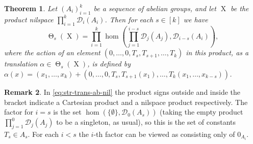 \documentclass[a4paper,12pt,reqno]{amsart}
\newtheorem{theorem}{Theorem}[section]
\theoremstyle{definition}
\newtheorem{remark}[theorem]{Remark}
\newcommand{\mc}{\mathcal}
\DeclareMathOperator{\tran}{\Theta}
\DeclareMathOperator{\ns}{X}
\begin{document}
\begin{theorem}\label{thm:decrip-trans-group}
Let $(A_i)_{i=1}^k$ be a sequence of abelian groups, and let $\ns$ be the product nilspace $\prod_{i=1}^k\mc{D}_i(A_i)$. Then for each $s\in [k]$ we have
\begin{equation}\label{eq:str-trans-ab-nil}
\tran_s(\ns) = \prod_{i=1}^k \hom\left(\prod_{j=1}^{i-s} \mc{D}_j(A_j),\mc{D}_{i-s}(A_i)\right),
\end{equation}
where the action of an element $(0,\ldots,0,T_s,T_{s+1},\ldots,T_k)$ in this product, as a translation $\alpha\in \tran_s(\ns)$, is defined by $\alpha(x)=(x_1,\ldots,x_k)+(0,\ldots,0,T_s,T_{s+1}(x_1),\ldots,T_k(x_1,\ldots,x_{k-s}))$.
\end{theorem}

\begin{remark}
In \eqref{eq:str-trans-ab-nil} the product signs outside and inside the bracket indicate a Cartesian product and a nilspace product respectively. The factor for $i=s$ is the set $\hom(\{\emptyset\},\mc{D}_0(A_s))$ (taking the empty product $\prod_{j=1}^{0} \mc{D}_j(A_j)$ to be a singleton, as usual), so this is the set of constants $T_s\in A_s$. For each $i<s$ the $i$-th factor can be viewed as consisting only of $0_{A_i}$.
\end{remark}
\end{document}
